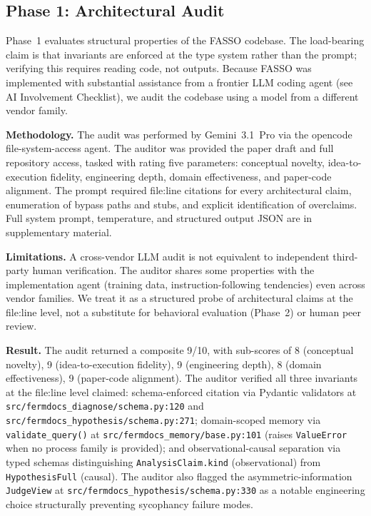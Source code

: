 \documentclass[11pt]{article}
\begin{document}
\subsection{Phase 1: Architectural Audit}
\label{subsec:phase1}

Phase~1 evaluates structural properties of the FASSO codebase. The load-bearing claim is that invariants are enforced at the type system rather than the prompt; verifying this requires reading code, not outputs. Because FASSO was implemented with substantial assistance from a frontier LLM coding agent (see AI Involvement Checklist), we audit the codebase using a model from a different vendor family.

\textbf{Methodology.} The audit was performed by Gemini~3.1~Pro via the opencode file-system-access agent. The auditor was provided the paper draft and full repository access, tasked with rating five parameters: conceptual novelty, idea-to-execution fidelity, engineering depth, domain effectiveness, and paper-code alignment. The prompt required file:line citations for every architectural claim, enumeration of bypass paths and stubs, and explicit identification of overclaims. Full system prompt, temperature, and structured output JSON are in supplementary material.

\textbf{Limitations.} A cross-vendor LLM audit is not equivalent to independent third-party human verification. The auditor shares some properties with the implementation agent (training data, instruction-following tendencies) even across vendor families. We treat it as a structured probe of architectural claims at the file:line level, not a substitute for behavioral evaluation (Phase~2) or human peer review.

\textbf{Result.} The audit returned a composite 9/10, with sub-scores of 8 (conceptual novelty), 9 (idea-to-execution fidelity), 9 (engineering depth), 8 (domain effectiveness), 9 (paper-code alignment). The auditor verified all three invariants at the file:line level claimed: schema-enforced citation via Pydantic validators at \texttt{src/fermdocs\_diagnose/schema.py:120} and \texttt{src/fermdocs\_hypothesis/schema.py:271}; domain-scoped memory via \texttt{validate\_query()} at \texttt{src/fermdocs\_memory/base.py:101} (raises \texttt{ValueError} when no process family is provided); and observational-causal separation via typed schemas distinguishing \texttt{AnalysisClaim.kind} (observational) from \texttt{HypothesisFull} (causal). The auditor also flagged the asymmetric-information \texttt{JudgeView} at \texttt{src/fermdocs\_hypothesis/schema.py:330} as a notable engineering choice structurally preventing sycophancy failure modes.
\end{document}
